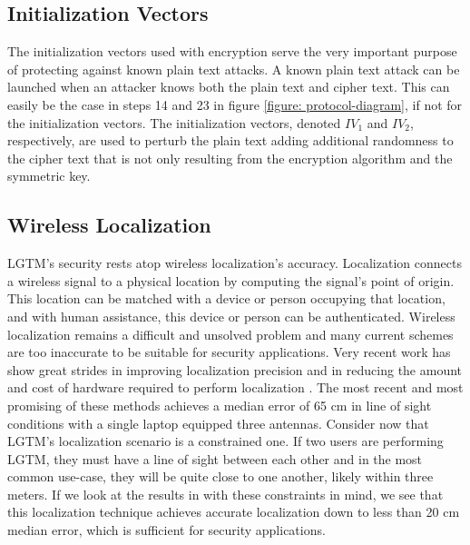 \documentclass[12pt]{report}
\begin{document}
\subsection{Initialization Vectors}
The initialization vectors used with encryption serve the very important purpose of protecting against known plain text attacks. A known plain text attack can be launched when an attacker knows both the plain text and cipher text. This can easily be the case in steps 14 and 23 in figure \ref{figure: protocol-diagram}, if not for the initialization vectors. The initialization vectors, denoted $IV_{1}$ and $IV_{2}$, respectively, are used to perturb the plain text adding additional randomness to the cipher text that is not only resulting from the encryption algorithm and the symmetric key. \par

\subsection{Wireless Localization}
LGTM's security rests atop wireless localization's accuracy. Localization connects a wireless signal to a physical location by computing the signal's point of origin. This location can be matched with a device or person occupying that location, and with human assistance, this device or person can be authenticated. Wireless localization remains a difficult and unsolved problem and many current schemes are too inaccurate to be suitable for security applications. Very recent work has show great strides in improving localization precision and in reducing the amount and cost of hardware required to perform localization \cite{UbicarseKumar2014,SpotFiKotaru2015,ChronosSingleAPLocalizationVasisht2016}. The most recent and most promising of these methods \cite{ChronosSingleAPLocalizationVasisht2016} achieves a median error of 65 cm in line of sight conditions with a single laptop equipped three antennas. Consider now that LGTM's localization scenario is a constrained one. If two users are performing LGTM, they must have a line of sight between each other and in the most common use-case, they will be quite close to one another, likely within three meters. If we look at the results in \cite{ChronosSingleAPLocalizationVasisht2016} with these constraints in mind, we see that this localization technique achieves accurate localization down to less than 20 cm median error, which is sufficient for security applications. \par
\end{document}
